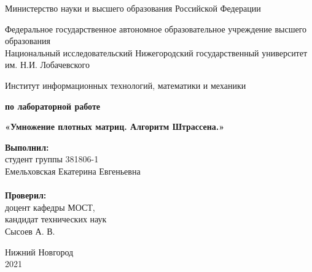 \documentclass{report}
\begin{document}
\begin{titlepage}

\begin{center}
Министерство науки и высшего образования Российской Федерации
\end{center}

\begin{center}
Федеральное государственное автономное образовательное учреждение высшего образования \\
Национальный исследовательский Нижегородский государственный университет им. Н.И. Лобачевского
\end{center}

\begin{center}
Институт информационных технологий, математики и механики
\end{center}

\vspace{4em}

\begin{center}
\textbf{ по лабораторной работе} \\
\end{center}
\begin{center}
\textbf{\Large«Умножение плотных матриц. Алгоритм Штрассена.»} \\
\end{center}

\vspace{4em}

\newbox{\lbox}
\newlength{\maxl}
\setlength{\maxl}{\wd\lbox}
\hfill\parbox{7cm}{
\hspace*{5cm}\hspace*{-5cm}\textbf{Выполнил:} \\ студент группы 381806-1 \\ Емельховская Екатерина Евгеньевна\\
\\
\hspace*{5cm}\hspace*{-5cm}\textbf{Проверил:}\\ доцент кафедры МОСТ, \\ кандидат технических наук \\ Сысоев А. В.
}

\vspace{\fill}

\begin{center} Нижний Новгород \\ 2021 \end{center}

\end{titlepage}
\end{document}
